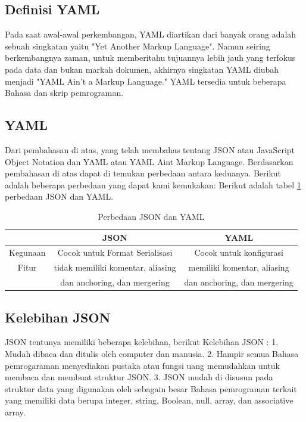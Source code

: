 \documentclass[a4paper]{article}
\begin{document}
\subsection{Definisi YAML}
Pada saat awal-awal perkembangan, YAML diartikan dari banyak orang adalah sebuah singkatan yaitu "Yet Another Markup Language". Namun seiring berkembangnya zaman, untuk memberitahu tujuannya lebih jauh yang terfokus pada data dan bukan markah dokumen, akhirnya singkatan YAML diubah menjadi "YAML Ain't a Markup Language." YAML tersedia untuk beberapa Bahasa dan skrip pemrograman.
\subsection{YAML}
Dari pembahasan di atas, yang telah membahas tentang JSON atau JavaScript Object Notation dan YAML atau YAML Aint Markup Language. Berdasarkan pembahasan di atas dapat di temukan perbedaan antara keduanya. Berikut adalah beberapa perbedaan yang dapat kami kemukakan:
Berikut adalah tabel \ref{table:perbedaan} perbedaan JSON dan YAML.
\begin{table}[h]
\caption{Perbedaan JSON dan YAML}

\centering
\begin{tabular}{ccc}
\hline
&JSON&YAML\\
\hline
Kegunaan&Cocok untuk Format Serialisasi&Cocok untuk konfigurasi\\
\hline
Fitur&tidak memiliki komentar, aliasing&memiliki komentar, aliasing \\
&dan anchoring, dan  mergering& dan anchoring, dan  mergering\\
\hline
\end{tabular}
\label{table:perbedaan}
\end{table}

\subsection{Kelebihan JSON}
JSON tentunya memiliki beberapa kelebihan, berikut Kelebihan JSON :
1.	Mudah dibaca dan ditulis oleh computer dan manusia.
2.	Hampir semua Bahasa pemrogaraman menyediakan pustaka atau fungsi uang memudahkan untuk membaca dan membuat struktur JSON.
3.	JSON mudah di disusun pada struktur data yang digunakan oleh sebagain besar Bahasa pemrograman terkait yang memiliki data berupa integer, string, Boolean, null, array, dan associative array.
\end{document}
